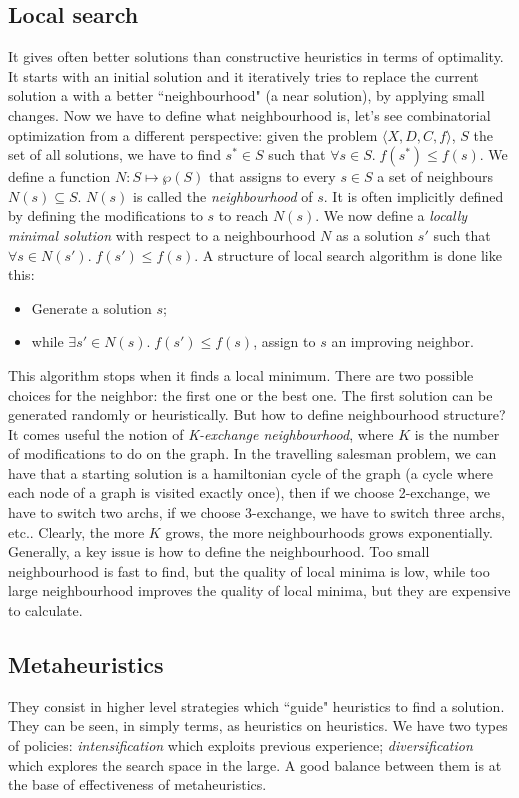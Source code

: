 \documentclass[10pt,a4paper]{article}
\begin{document}
\subsection{Local search}
It gives often better solutions than constructive heuristics in terms of
optimality. It starts with an initial solution and it iteratively tries to
replace the current solution a with a better ``neighbourhood" (a near solution),
by applying small changes. Now we have to define what neighbourhood is, let's
see combinatorial optimization from a different perspective: given the problem
$\langle X, D, C, f \rangle$, $S$ the set of all solutions, we have to find
$s^* \in S$ such that $\forall s \in S. \; f(s^*) \leq f(s)$. We define a
function $N: S \mapsto \wp(S)$ that assigns to every $s \in S$ a set of
neighbours $N(s) \subseteq S$. $N(s)$ is called the \textit{neighbourhood} of
$s$. It is often implicitly defined by defining the modifications to $s$ to
reach $N(s)$. We now define a \textit{locally minimal solution} with respect to
a neighbourhood $N$ as a solution $s'$ such that
$\forall s \in N(s'). \; f(s') \leq f(s)$. A structure of local search algorithm
is done like this:
\begin{itemize}
    \item Generate a solution $s$;
    \item while $\exists s' \in N(s). \; f(s') \leq f(s)$, assign to $s$ an
    improving neighbor.
\end{itemize}
This algorithm stops when it finds a local minimum. There are two possible
choices for the neighbor: the first one or the best one. The first solution can
be generated randomly or heuristically. But how to define neighbourhood
structure? It comes useful the notion of \textit{K-exchange neighbourhood},
where $K$ is the number of modifications to do on the graph. In the travelling
salesman problem, we can have that a starting solution is a hamiltonian cycle of
the graph (a cycle where each node of a graph is visited exactly once), then if
we choose 2-exchange, we have to switch two archs, if we choose 3-exchange, we
have to switch three archs, etc.. Clearly, the more $K$ grows, the more
neighbourhoods grows exponentially. Generally, a key issue is how to define the
neighbourhood. Too small neighbourhood is fast to find, but the quality of local
minima is low, while too large neighbourhood improves the quality of local
minima, but they are expensive to calculate.

\subsection{Metaheuristics}
They consist in higher level strategies which ``guide" heuristics to find a
solution. They can be seen, in simply terms, as heuristics on heuristics. We
have two types of policies: \textit{intensification} which exploits previous
experience; \textit{diversification} which explores the search space in the
large. A good balance between them is at the base of effectiveness of
metaheuristics.
\end{document}
